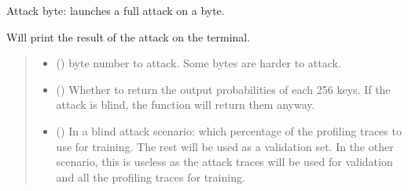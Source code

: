 \documentclass[letterpaper,10pt,english]{sphinxmanual}
\begin{document}
\begin{fulllineitems}
\begin{fulllineitems}
\begin{quote}
\begin{description}
\begin{itemize}
\end{itemize}

\end{description}\end{quote}

\end{fulllineitems}


\begin{fulllineitems}
\label{\detokenize{MLSCAlib.Attacks:MLSCAlib.Attacks.profiled.Profiled.attack_byte}}
\pysigstartsignatures
{}
\pysigstopsignatures
\sphinxAtStartPar
Attack byte: launches a full attack on a byte.

\sphinxAtStartPar
Will print the result of the attack on the terminal.
\begin{quote}\begin{description}
\begin{itemize}
\item {} 
\sphinxAtStartPar
{} () \textendash{} byte number to attack. Some bytes are harder to attack.

\item {} 
\sphinxAtStartPar
{} (\sphinxstyleliteralemphasis{\sphinxupquote{, }}) \textendash{} Whether to return the output probabilities of each 256 keys. If
the attack is blind, the function will return them anyway.

\item {} 
\sphinxAtStartPar
{} (\sphinxstyleliteralemphasis{\sphinxupquote{, }}) \textendash{} In a blind attack scenario: which percentage of the profiling
traces to use for training. The rest will be used as a validation
set. In the other scenario, this is useless as the attack traces
will be used for validation and all the profiling traces for training.


\end{itemize}
\end{description}
\end{quote}
\end{fulllineitems}
\end{fulllineitems}
\end{document}
